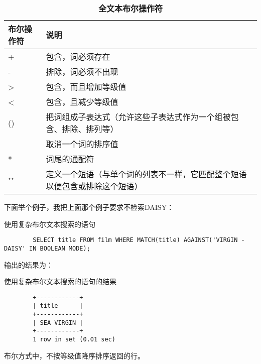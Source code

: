 \documentclass[UTF8]{article}
\begin{document}
\begin{table}[H]
        \caption{\textbf{全文本布尔操作符}}%
        \centering%
        \begin{tabular}{ll}%
        \toprule%
        布尔操作符&说明\\
        \midrule%
        + & 包含，词必须存在 \\
        - & 排除，词必须不出现 \\
        > & 包含，而且增加等级值 \\
        < & 包含，且减少等级值 \\
        () & 把词组成子表达式（允许这些子表达式作为一个组被包含、排除、排列等） \\
        ~ & 取消一个词的排序值 \\
        * & 词尾的通配符 \\
        "" & 定义一个短语（与单个词的列表不一样，它匹配整个短语以便包含或排除这个短语） \\
        \bottomrule%
        \end{tabular}
\end{table} 
下面举个例子，我把上面那个例子要求不检索DAISY： 


        
\begin{listing}[H]
        \caption{使用复杂布尔文本搜索的语句}
	\label{code:usedifficultbooleanmodeclause}
\begin{verbatim}
        SELECT title FROM film WHERE MATCH(title) AGAINST('VIRGIN -DAISY' IN BOOLEAN MODE);
\end{verbatim}
\end{listing}


输出的结果为：

\begin{listing}[H]
	\caption{使用复杂布尔文本搜索的语句的结果}
	\label{code:usedifficultbooleanmodeclauseresult}
\begin{verbatim}
        +------------+
        | title      |
        +------------+
        | SEA VIRGIN |
        +------------+
        1 row in set (0.01 sec)
\end{verbatim}
\end{listing}

\begin{orangebox}[frametitle={Tips 18.4.3 排列而不排序}]
        布尔方式中，不按等级值降序排序返回的行。
\end{orangebox} 
\end{document}
